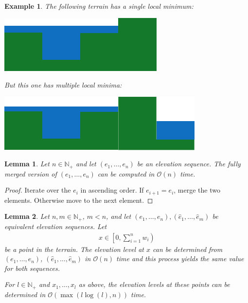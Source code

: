 \documentclass[11pt,a4paper]{article}
\newtheorem{lem}{Lemma}
\newtheorem{ex}{Example}
\newcommand{\Np}{\mathbb{N}_+}
\newcommand{\bO}{\mathcal{O}}
\begin{document}
\begin{ex}
  The following terrain has a single local minimum:
  \begin{center}
    \includegraphics{im3.pdf}
  \end{center}
  But this one has multiple local minima:
  \begin{center}
    \includegraphics{im4.pdf}
  \end{center}
\end{ex}

\begin{lem}
    Let $n\in\Np$ and let $(e_1,\ldots,e_n)$ be an elevation sequence.
    The fully merged version of $(e_1,\ldots,e_n)$ can be computed in $\bO(n)$ time.
\end{lem}

\begin{proof}
    Iterate over the $e_i$ in ascending order.
    If $e_{i+1} = e_i$, merge the two elements.
    Otherwise move to the next element.
\end{proof}

\begin{lem}
  Let $n,m\in\Np$, $m < n$, and let $(e_1,\ldots,e_n), (\hat{e}_1,\ldots,\hat{e}_m)$ be equivalent elevation sequences. Let
  \begin{align*}
      x \in \left[0, \sum_{i=1}^n w_i\right)
  \end{align*}
  be a point in the terrain.
  The elevation level at $x$ can be determined from $(e_1,\ldots,e_n)$, $(\hat{e}_1,\ldots,\hat{e}_m)$ in $\bO(n)$ time and this process yields the same value for both sequences.

  For $l\in\Np$ and $x_1,\ldots,x_l$ as above, the elevation levels at these points can be determined
  in $\bO(\max(l\log(l), n))$ time.
\end{lem}
\end{document}
